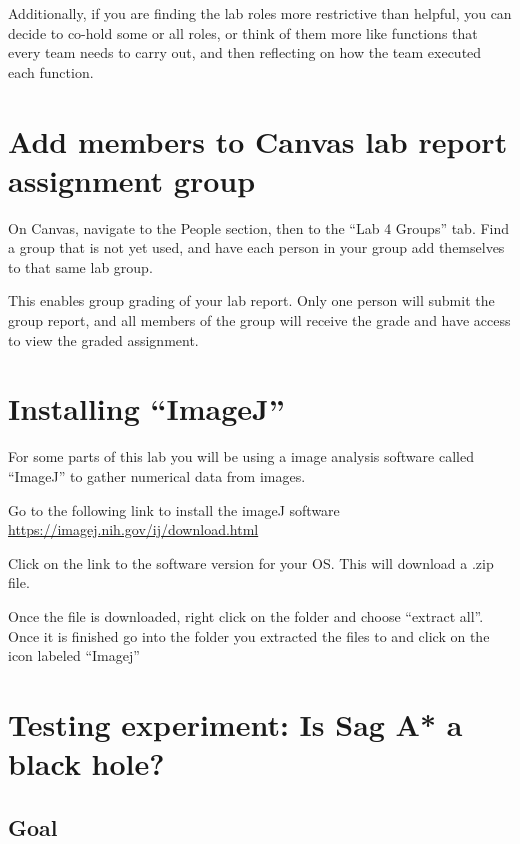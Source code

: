 Additionally, if you are finding the lab roles more restrictive than helpful, you can decide to co-hold some or all roles, or think of them more like functions that every team needs to carry out, and then reflecting on how the team executed each function.

\section{Add members to Canvas lab report assignment group}

\begin{steps}
	\item On Canvas, navigate to the People section, then to the ``Lab 4 Groups'' tab. Find a group that is not yet used, and have each person in your group add themselves to that same lab group.
\end{steps}

This enables group grading of your lab report. Only one person will submit the group report, and all members of the group will receive the grade and have access to view the graded assignment.

\section{Installing ``ImageJ''}
For some parts of this lab you will be using a image analysis software called ``ImageJ'' to gather numerical data from images.
\begin{steps}
	\item Go to the following link to install the imageJ software \url{https://imagej.nih.gov/ij/download.html}
	\item Click on the link to the software version for your OS. This will download a .zip file.
	\item Once the file is downloaded, right click on the folder and choose ``extract all''. Once it is finished go into the folder you extracted the files to and click on the icon labeled ``Imagej''
\end{steps}

\section{Testing experiment: Is Sag A* a black hole?}

\subsection{Goal}


